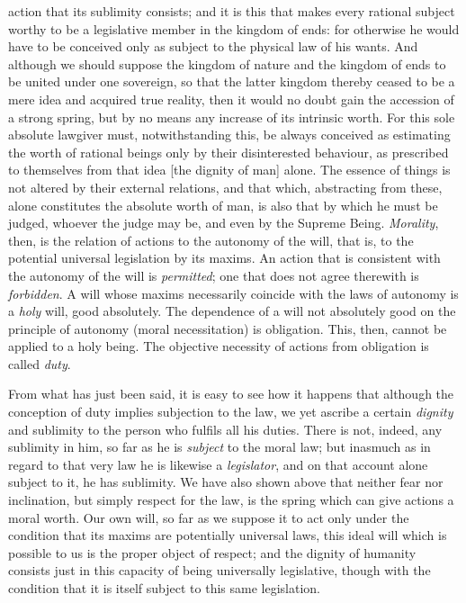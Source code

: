 action that its sublimity consists; and it is this that makes every
rational subject worthy to be a legislative member in the kingdom of
ends: for otherwise he would have to be conceived only as subject to
the physical law of his wants. And although we should suppose the
kingdom of nature and the kingdom of ends to be united under one
sovereign, so that the latter kingdom thereby ceased to be a mere idea
and acquired true reality, then it would no doubt gain the accession
of a strong spring, but by no means any increase of its intrinsic
worth. For this sole absolute lawgiver must, notwithstanding this, be
always conceived as estimating the worth of rational beings only by
their disinterested behaviour, as prescribed to themselves from that
idea [the dignity of man] alone. The essence of things is not altered
by their external relations, and that which, abstracting from these,
alone constitutes the absolute worth of man, is also that by which he
must be judged, whoever the judge may be, and even by the Supreme
Being. \textit{Morality}, then, is the relation of actions to the
autonomy of the will, that is, to the potential universal legislation
by its maxims. An action that is consistent with the autonomy of the
will is \textit{permitted}; one that does not agree therewith is
\textit{forbidden}. A will whose maxims necessarily coincide with the
laws of autonomy is a \textit{holy} will, good absolutely. The
dependence of a will not absolutely good on the principle of autonomy
(moral necessitation) is obligation. This, then, cannot be applied to
a holy being. The objective necessity of actions from obligation is
called \textit{duty}.

From what has just been said, it is easy to see how it happens that
although the conception of duty implies subjection to the law, we yet
ascribe a certain \textit{dignity} and sublimity to the person who
fulfils all his duties. There is not, indeed, any sublimity in him, so
far as he is \textit{subject} to the moral law; but inasmuch as in
regard to that very law he is likewise a \textit{legislator}, and on
that account alone subject to it, he has sublimity. We have also shown
above that neither fear nor inclination, but simply respect for the
law, is the spring which can give actions a moral worth. Our own will,
so far as we  suppose it to act only under the condition that
its maxims are potentially universal laws, this ideal will which is
possible to us is the proper object of respect; and the dignity of
humanity consists just in this capacity of being universally
legislative, though with the condition that it is itself subject to
this same legislation.

